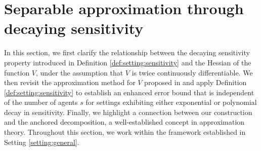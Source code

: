 \documentclass{article}
\begin{document}
\section{Separable approximation through decaying sensitivity}\label{sec:sep}
In this section, we first clarify the relationship between the decaying sensitivity property introduced in Definition \ref{def:setting:sensitivity} and the Hessian of the function $V$, under the assumption that $V$ is twice continuously differentiable. We then revisit the approximation method for $V$ proposed in \cite{sperl2023separable} and apply Definition \ref{def:setting:sensitivity} to establish an enhanced error bound that is independent of the number of agents $s$ for settings exhibiting either exponential or polynomial decay in sensitivity. Finally, we highlight a connection between our construction and the anchored decomposition, a well-established concept in approximation theory. Throughout this section, we work within the framework established in Setting \ref{setting:general}.
\end{document}
